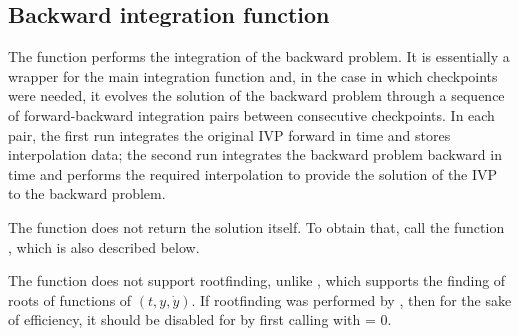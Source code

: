 \subsection{Backward integration function}
\label{sss:idasolveb}

The function  performs the integration of the backward problem.
It is essentially a wrapper for the {\idas} main integration function
 and, in the case in which checkpoints were needed, it evolves
the solution of the backward problem through a sequence of forward-backward
integration pairs between consecutive checkpoints.
In each pair, the first run integrates the original IVP forward in time and
stores interpolation data; the second run integrates the backward problem
backward in time and performs the required interpolation to provide
the solution of the IVP to the backward problem.

The function  does not return the solution 
itself.  To obtain that, call the function , which is
also described below.

The  function does not support rootfinding, unlike
, which supports the finding of roots of functions of
$(t,y,\dot{y})$.  If rootfinding was performed by , then
for the sake of efficiency, it should be disabled for 
by first calling  with  = 0.

